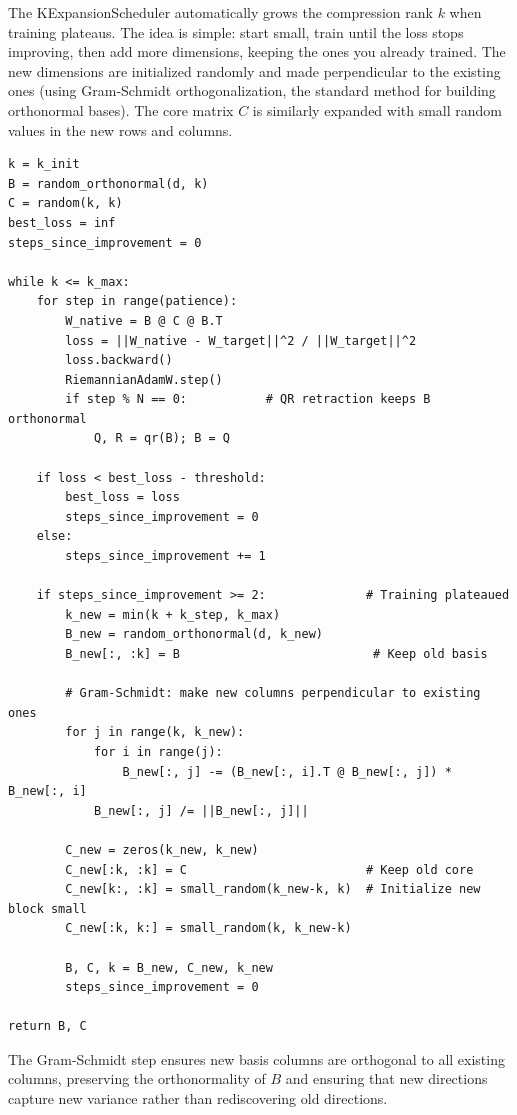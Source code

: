 \documentclass[11pt]{article}
\begin{document}
The KExpansionScheduler automatically grows the compression rank $k$ when
training plateaus. The idea is simple: start small, train until the loss
stops improving, then add more dimensions, keeping the ones you already
trained. The new dimensions are initialized randomly and made perpendicular
to the existing ones (using Gram-Schmidt orthogonalization, the standard
method for building orthonormal bases). The core matrix $C$ is similarly
expanded with small random values in the new rows and columns.

\begin{verbatim}
k = k_init
B = random_orthonormal(d, k)
C = random(k, k)
best_loss = inf
steps_since_improvement = 0

while k <= k_max:
    for step in range(patience):
        W_native = B @ C @ B.T
        loss = ||W_native - W_target||^2 / ||W_target||^2
        loss.backward()
        RiemannianAdamW.step()
        if step % N == 0:           # QR retraction keeps B orthonormal
            Q, R = qr(B); B = Q
    
    if loss < best_loss - threshold:
        best_loss = loss
        steps_since_improvement = 0
    else:
        steps_since_improvement += 1
    
    if steps_since_improvement >= 2:              # Training plateaued
        k_new = min(k + k_step, k_max)
        B_new = random_orthonormal(d, k_new)
        B_new[:, :k] = B                           # Keep old basis
        
        # Gram-Schmidt: make new columns perpendicular to existing ones
        for j in range(k, k_new):
            for i in range(j):
                B_new[:, j] -= (B_new[:, i].T @ B_new[:, j]) * B_new[:, i]
            B_new[:, j] /= ||B_new[:, j]||
        
        C_new = zeros(k_new, k_new)
        C_new[:k, :k] = C                         # Keep old core
        C_new[k:, :k] = small_random(k_new-k, k)  # Initialize new block small
        C_new[:k, k:] = small_random(k, k_new-k)
        
        B, C, k = B_new, C_new, k_new
        steps_since_improvement = 0

return B, C
\end{verbatim}

The Gram-Schmidt step ensures new basis columns are orthogonal to all existing columns, preserving the orthonormality of $B$ and ensuring that new directions capture new variance rather than rediscovering old directions.
\end{document}
